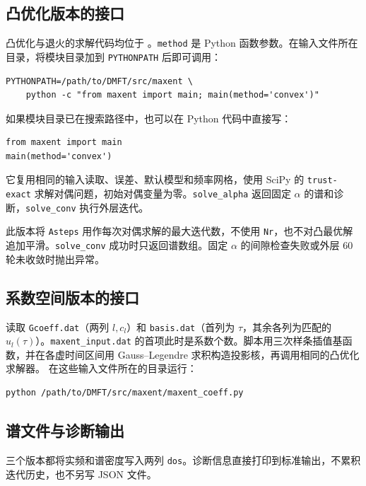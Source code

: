 \documentclass[UTF8,fontset=fandol,11pt]{ctexart}
\begin{document}
\subsection{凸优化版本的接口}
凸优化与退火的求解代码均位于 。\texttt{method} 是 Python 函数参数。在输入文件所在目录，将模块目录加到 \texttt{PYTHONPATH} 后即可调用：
\begin{verbatim}
PYTHONPATH=/path/to/DMFT/src/maxent \
    python -c "from maxent import main; main(method='convex')"
\end{verbatim}
如果模块目录已在搜索路径中，也可以在 Python 代码中直接写：
\begin{verbatim}
from maxent import main
main(method='convex')
\end{verbatim}
它复用相同的输入读取、误差、默认模型和频率网格，使用 SciPy 的 \texttt{trust-exact} 求解对偶问题，初始对偶变量为零。\texttt{solve\_alpha} 返回固定 $\alpha$ 的谱和诊断，\texttt{solve\_conv} 执行外层迭代。

此版本将 \texttt{Asteps} 用作每次对偶求解的最大迭代数，不使用 \texttt{Nr}，也不对凸最优解追加平滑。\texttt{solve\_conv} 成功时只返回谱数组。固定 $\alpha$ 的间隙检查失败或外层 60 轮未收敛时抛出异常。

\subsection{系数空间版本的接口}
 读取 \texttt{Gcoeff.dat}（两列 $l,c_l$）和 \texttt{basis.dat}（首列为 $\tau$，其余各列为匹配的 $u_l(\tau)$）。\texttt{maxent\_input.dat} 的首项此时是系数个数。脚本用三次样条插值基函数，并在各虚时间区间用 Gauss--Legendre 求积构造投影核，再调用相同的凸优化求解器。
在这些输入文件所在的目录运行：
\begin{verbatim}
python /path/to/DMFT/src/maxent/maxent_coeff.py
\end{verbatim}

\subsection{谱文件与诊断输出}
三个版本都将实频和谱密度写入两列 \texttt{dos}。诊断信息直接打印到标准输出，不累积迭代历史，也不另写 JSON 文件。
\end{document}

